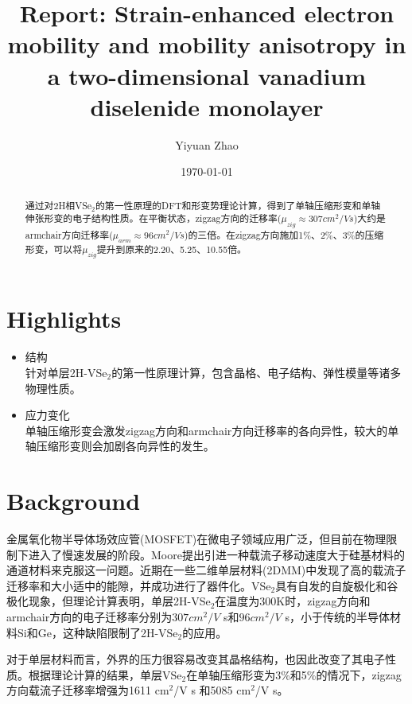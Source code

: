 \documentclass[reprint, aps, prb, showkeys]{revtex4-2}
\begin{document}
\title{Report: Strain-enhanced electron mobility and mobility anisotropy in a two-dimensional vanadium diselenide monolayer}

\author{Yiyuan Zhao}
\date{\today}

\begin{abstract}
通过对2H相VSe$_2$的第一性原理的DFT和形变势理论计算，得到了单轴压缩形变和单轴伸张形变的电子结构性质。在平衡状态，zigzag方向的迁移率($\mu_{zig} \approx 307 cm^2/V s$)大约是armchair方向迁移率($\mu_{arm} \approx 96 cm^2/V s$)的三倍。在zigzag方向施加1\%、2\%、3\%的压缩形变，可以将$\mu_{zig}$提升到原来的2.20、5.25、10.55倍。
\end{abstract}


\maketitle
\section{Highlights}
\begin{itemize}
    \item 结构 \\
    针对单层2H-VSe$_2$的第一性原理计算，包含晶格、电子结构、弹性模量等诸多物理性质。
    \item 应力变化 \\
    单轴压缩形变会激发zigzag方向和armchair方向迁移率的各向异性，较大的单轴压缩形变则会加剧各向异性的发生。
\end{itemize}


\section{Background}
金属氧化物半导体场效应管(MOSFET)在微电子领域应用广泛，但目前在物理限制下进入了慢速发展的阶段。Moore提出引进一种载流子移动速度大于硅基材料的通道材料来克服这一问题。近期在一些二维单层材料(2DMM)中发现了高的载流子迁移率和大小适中的能隙，并成功进行了器件化。VSe$_2$具有自发的自旋极化和谷极化现象，但理论计算表明，单层2H-VSe$_2$在温度为300K时，zigzag方向和armchair方向的电子迁移率分别为$307 cm^2/V$ s和$96 cm^2/V$ s，小于传统的半导体材料Si和Ge，这种缺陷限制了2H-VSe$_2$的应用。

对于单层材料而言，外界的压力很容易改变其晶格结构，也因此改变了其电子性质。根据理论计算的结果，单层VSe$_2$在单轴压缩形变为3\%和5\%的情况下，zigzag方向载流子迁移率增强为1611 cm$^2$/V s 和5085 cm$^2$/V s。
\end{document}
